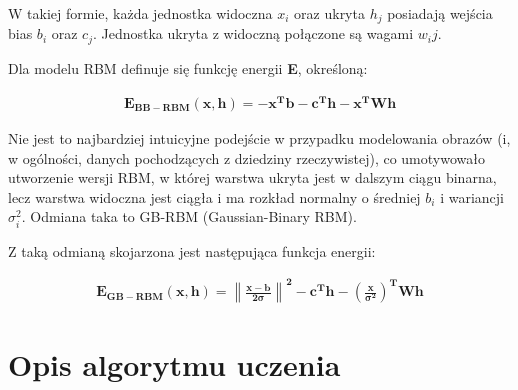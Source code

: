 \documentclass[a4paper,10pt]{article} %
\begin{document}
W takiej formie, każda jednostka widoczna $x_i$ oraz ukryta $h_j$ posiadają wejścia bias $b_i$ oraz $c_j$. Jednostka ukryta z widoczną połączone są wagami $w_ij$.

Dla modelu RBM definuje się funkcję energii \textbf{E}, określoną:

\begin{align}
	\mathbf{E_{BB-RBM}(x,h) = -x^Tb - c^Th - x^TWh}
\end{align}

Nie jest to najbardziej intuicyjne podejście w przypadku modelowania obrazów (i, w ogólności, danych pochodzących z dziedziny rzeczywistej), co umotywowało utworzenie wersji RBM, w której warstwa ukryta jest w dalszym ciągu binarna, lecz warstwa widoczna jest ciągła i ma rozkład normalny o średniej $b_i$ i wariancji $\sigma^2_i$. Odmiana taka to GB-RBM (Gaussian-Binary RBM).

Z taką odmianą skojarzona jest następująca funkcja energii:

\begin{align}
	\mathbf{E_{GB-RBM}(x,h) = \left\| \frac{x - b}{2 \sigma} \right\| ^2 - c^Th - \left( \frac{x}{\sigma^2} \right) ^TWh}
\end{align}

\section{Opis algorytmu uczenia}
\end{document}
